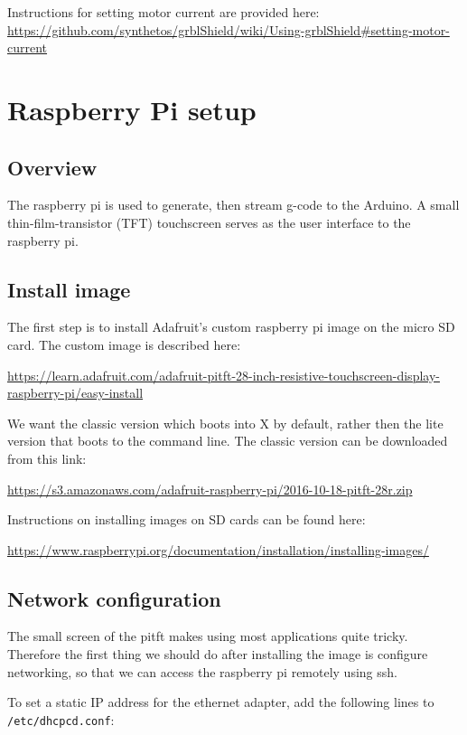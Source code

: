 \documentclass[]{book}
\theoremstyle{definition}
\theoremstyle{definition}
\theoremstyle{remark}
\begin{document}
Instructions for setting motor current are provided here:
\url{https://github.com/synthetos/grblShield/wiki/Using-grblShield\#setting-motor-current}

\chapter{Raspberry Pi setup}\label{raspi}

\section{Overview}\label{overview-1}

The raspberry pi is used to generate, then stream g-code to the Arduino.
A small thin-film-transistor (TFT) touchscreen serves as the user
interface to the raspberry pi.

\section{Install image}\label{install-image}

The first step is to install Adafruit's custom raspberry pi image on the
micro SD card. The custom image is described here:

\url{https://learn.adafruit.com/adafruit-pitft-28-inch-resistive-touchscreen-display-raspberry-pi/easy-install}

We want the classic version which boots into X by default, rather then
the lite version that boots to the command line. The classic version can
be downloaded from this link:

\url{https://s3.amazonaws.com/adafruit-raspberry-pi/2016-10-18-pitft-28r.zip}

Instructions on installing images on SD cards can be found here:

\url{https://www.raspberrypi.org/documentation/installation/installing-images/}

\section{Network configuration}\label{network-configuration}

The small screen of the pitft makes using most applications quite
tricky. Therefore the first thing we should do after installing the
image is configure networking, so that we can access the raspberry pi
remotely using ssh.

To set a static IP address for the ethernet adapter, add the following
lines to \texttt{/etc/dhcpcd.conf}:
\end{document}
